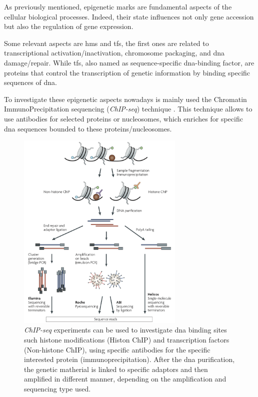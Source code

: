 As previously mentioned, epigenetic marks are fundamental aspects of the cellular biological processes. 
Indeed, their state influences not only gene accession but also the regulation of gene expression.

Some relevant aspects are \glspl{hm} and \glspl{tf}, the first ones are related to transcriptional activation/inactivation, chromosome packaging, and \gls{dna} damage/repair.
While \glspl{tf}, also named as sequence-specific \gls{dna}-binding factor, are proteins that control the transcription of genetic information by binding specific sequences of \gls{dna}.

To investigate these epigenetic aspects nowadays is mainly used the Chromatin ImmunoPrecipitation sequencing (\textit{ChIP-seq}) technique \cite{Park2009}.
This technique allows to use antibodies for selected proteins or nucleosomes, which enriches for specific \gls{dna} sequences bounded to these proteins/nucleosomes.

\begin{figure}[H]
\centering
\includegraphics[width=8cm, keepaspectratio]{img/intro/chip.png}
\caption[ChIP-seq experiment]{\textit{ChIP-seq} experiments can be used to investigate \gls{dna} binding sites such histone modifications (Histon ChIP) and transcription factors (Non-histone ChIP), using specific antibodies for the specific interested protein (immunoprecipitation).
After the \gls{dna} purification, the genetic matherial is linked to specific adaptors and then amplified in different manner, depending on the amplification and sequencing type used. \cite{Park2009}}
\label{fig:chipseqexp}
\end{figure}

